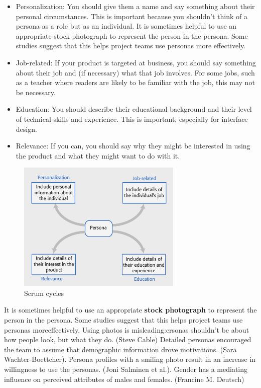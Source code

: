 \documentclass[10pt,a4paper]{report}
\begin{document}
\begin{itemize}
	\item Personalization: You should give them a name and say something about their personal
	circumstances. This is important because you shouldn’t think of a persona as a
	role but as an individual. It is sometimes helpful to use an appropriate stock
	photograph to represent the person in the persona. Some studies suggest that this
	helps project teams use personas more effectively.
	\item Job-related: If your product is targeted at business, you should say something about their job
	and (if necessary) what that job involves. For some jobs, such as a teacher where
	readers are likely to be familiar with the job, this may not be necessary.
	\item Education: You should describe their educational background and their level of technical skills
	and experience. This is important, especially for interface design.
	\item Relevance: If you can, you should say why they might be interested in using the product and
	what they might want to do with it.
\end{itemize}
\begin{figure}[h]
	\centering
	\includegraphics[width=0.7\textwidth]{image17}
	\caption{Scrum cycles}
	\label{image17}
\end{figure}
It is sometimes helpful to use an appropriate \textbf{stock photograph} to represent the person in the persona. Some studies suggest
that this helps project teams use personas moreeffectively.
Using photos is misleading:ersonas shouldn’t be about how people look, but what they do. (Steve Cable)
Detailed personas encouraged the team to assume that demographic information drove motivations. (Sara Wachter-Boettcher).
Persona profiles with a smiling photo result in an increase in willingness to use the personas. (Joni Salminen et al.). Gender has a mediating influence on perceived attributes of males and females. (Francine M. Deutsch)
\end{document}
